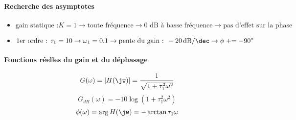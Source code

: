 \paragraph{Recherche des asymptotes}
\begin{itemize}
    \item $\textrm{gain statique :} K=1      \rightarrow 
           \textrm{toute fréquence}             \rightarrow 
           \textrm{0 dB à basse fréquence}      \rightarrow 
           \textrm{pas d'effet sur la phase}$
    \item $\textrm{1er ordre : }\tau_1=10        \rightarrow 
           \omega_1=0.1                         \rightarrow 
           \textrm{pente du gain : }
           \SI[per-mode=symbol]{-20}{\dB\per\dec} \rightarrow 
        \phi\mathrel{+}=-90\si{\degree}$ 
\end{itemize}
\begin{center}
    

    
\end{center}
\paragraph{Fonctions réelles du gain et du déphasage}
\[
G(\omega)=|H(\jw)|=\dfrac{1}{\sqrt{1+\tau_1^2\omega^2}}
\]
\[
G_{dB}(\omega)=-10\log{(1+\tau_1^2\omega^2)}
\]
\[
\phi(\omega)=\arg{H(\jw)}=-\arctan{\tau_1\omega}
\]
